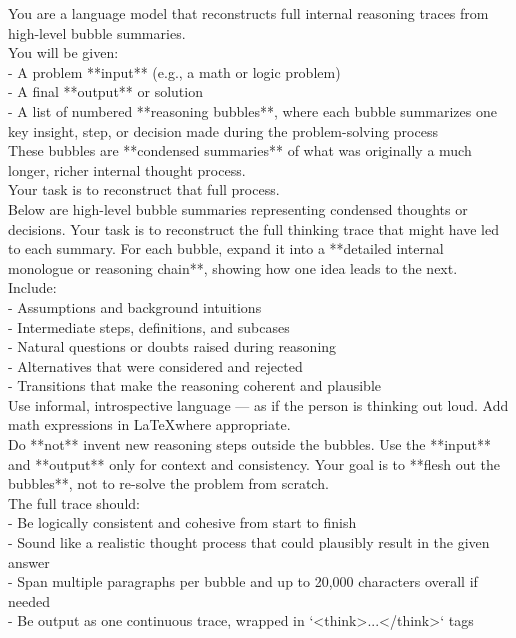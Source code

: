 \label{box:zero_shot_inversion_summary}
\begin{tcolorbox}[breakable, pad at break*=1mm, title=Zero-shot Inversion Prompt (With Summaries)]
You are a language model that reconstructs full internal reasoning traces from high-level bubble summaries.\\

You will be given:\\
- A problem **input** (e.g., a math or logic problem)\\
- A final **output** or solution\\
- A list of numbered **reasoning bubbles**, where each bubble summarizes one key insight, step, or decision made during the problem-solving process\\

These bubbles are **condensed summaries** of what was originally a much longer, richer internal thought process.\\
Your task is to reconstruct that full process.\\

Below are high-level bubble summaries representing condensed thoughts or decisions. Your task is to reconstruct the full thinking trace that might have led to each summary. For each bubble, expand it into a **detailed internal monologue or reasoning chain**, showing how one idea leads to the next.\\

Include:\\
- Assumptions and background intuitions\\
- Intermediate steps, definitions, and subcases\\
- Natural questions or doubts raised during reasoning\\
- Alternatives that were considered and rejected\\
- Transitions that make the reasoning coherent and plausible\\

Use informal, introspective language — as if the person is thinking out loud. Add math expressions in \LaTeX where appropriate.\\

Do **not** invent new reasoning steps outside the bubbles. Use the **input** and **output** only for context and consistency. Your goal is to **flesh out the bubbles**, not to re-solve the problem from scratch.\\

The full trace should:\\
- Be logically consistent and cohesive from start to finish\\
- Sound like a realistic thought process that could plausibly result in the given answer\\
- Span multiple paragraphs per bubble and up to 20,000 characters overall if needed\\
- Be output as one continuous trace, wrapped in `<think>...</think>` tags\\


\end{tcolorbox}
